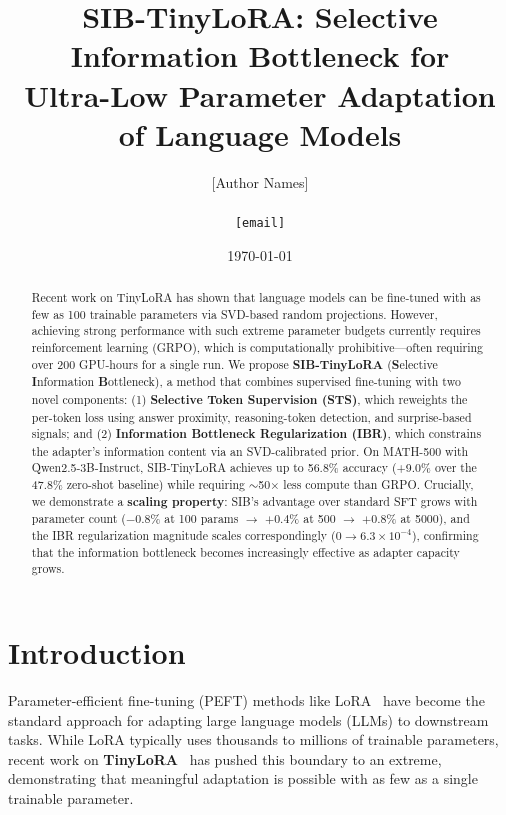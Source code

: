 \documentclass{article}
\title{%
  SIB-TinyLoRA: Selective Information Bottleneck for \\
  Ultra-Low Parameter Adaptation of Language Models
}
\author{
  [Author Names] \\
  [Affiliation] \\
  \texttt{[email]}
}
\date{\today}
\begin{document}
\maketitle

\begin{abstract}
Recent work on TinyLoRA has shown that language models can be fine-tuned with as few as 100 trainable parameters via SVD-based random projections. However, achieving strong performance with such extreme parameter budgets currently requires reinforcement learning (GRPO), which is computationally prohibitive---often requiring over 200 GPU-hours for a single run. We propose \textbf{SIB-TinyLoRA} (\textbf{S}elective \textbf{I}nformation \textbf{B}ottleneck), a method that combines supervised fine-tuning with two novel components: (1) \textbf{Selective Token Supervision (STS)}, which reweights the per-token loss using answer proximity, reasoning-token detection, and surprise-based signals; and (2) \textbf{Information Bottleneck Regularization (IBR)}, which constrains the adapter's information content via an SVD-calibrated prior. On MATH-500 with Qwen2.5-3B-Instruct, SIB-TinyLoRA achieves up to 56.8\% accuracy (+9.0\% over the 47.8\% zero-shot baseline) while requiring $\sim$50$\times$ less compute than GRPO. Crucially, we demonstrate a \textbf{scaling property}: SIB's advantage over standard SFT grows with parameter count ($-0.8$\% at 100 params $\rightarrow$ $+0.4$\% at 500 $\rightarrow$ $+0.8$\% at 5000), and the IBR regularization magnitude scales correspondingly ($0 \rightarrow 6.3 \times 10^{-4}$), confirming that the information bottleneck becomes increasingly effective as adapter capacity grows.
\end{abstract}

\section{Introduction}

Parameter-efficient fine-tuning (PEFT) methods like LoRA~\citep{hu2022lora} have become the standard approach for adapting large language models (LLMs) to downstream tasks. While LoRA typically uses thousands to millions of trainable parameters, recent work on \textbf{TinyLoRA}~\citep{morris2026tinylora} has pushed this boundary to an extreme, demonstrating that meaningful adaptation is possible with as few as a single trainable parameter.
\end{document}
